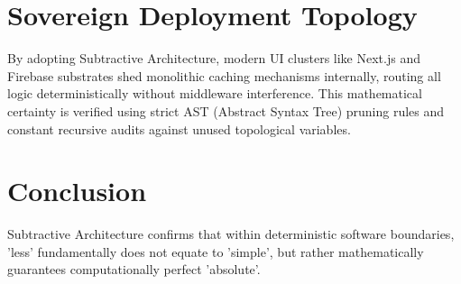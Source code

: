\documentclass[12pt, a4paper]{article}
\theoremstyle{plain}
\theoremstyle{definition}
\begin{document}
\section{Sovereign Deployment Topology}
By adopting Subtractive Architecture, modern UI clusters like Next.js and Firebase substrates shed monolithic caching mechanisms internally, routing all logic deterministically without middleware interference. This mathematical certainty is verified using strict AST (Abstract Syntax Tree) pruning rules and constant recursive audits against unused topological variables.

\section{Conclusion}
Subtractive Architecture confirms that within deterministic software boundaries, 'less' fundamentally does not equate to 'simple', but rather mathematically guarantees computationally perfect 'absolute'.





\vspace{3em}
\noindent\hrulefill
\vspace{1em}
\end{document}
